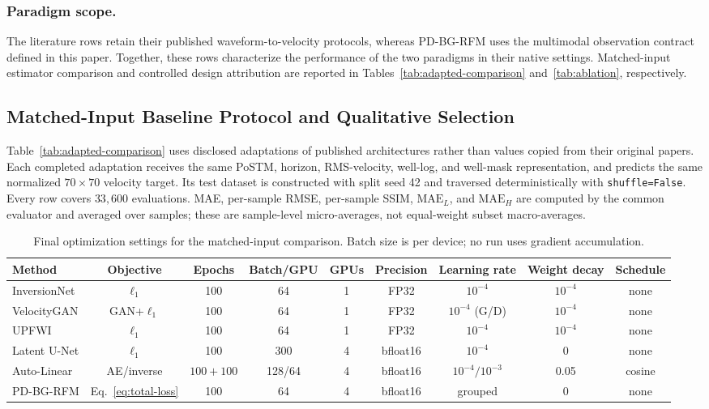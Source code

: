 \subsubsection{Paradigm scope.}
The literature rows retain their published waveform-to-velocity protocols, whereas PD-BG-RFM uses the multimodal observation contract defined in this paper. Together, these rows characterize the performance of the two paradigms in their native settings. Matched-input estimator comparison and controlled design attribution are reported in Tables~\ref{tab:adapted-comparison} and~\ref{tab:ablation}, respectively.


\subsection{Matched-Input Baseline Protocol and Qualitative Selection}
\label{app:adapted-accounting}
Table~\ref{tab:adapted-comparison} uses disclosed adaptations of published architectures rather than values copied from their original papers. Each completed adaptation receives the same PoSTM, horizon, RMS-velocity, well-log, and well-mask representation, and predicts the same normalized $70\times70$ velocity target. Its test dataset is constructed with split seed 42 and traversed deterministically with \texttt{shuffle=False}. Every row covers $33{,}600$ evaluations. MAE, per-sample RMSE, per-sample SSIM, $\mathrm{MAE}_L$, and $\mathrm{MAE}_H$ are computed by the common evaluator and averaged over samples; these are sample-level micro-averages, not equal-weight subset macro-averages.

\begin{table}[t]
\centering
\small
\begin{tabular}{@{}lcccccccc@{}}
\toprule
Method & Objective & Epochs & Batch/GPU & GPUs & Precision & Learning rate & Weight decay & Schedule \\
\midrule
InversionNet & $\ell_1$ & 100 & 64 & 1 & FP32 & $10^{-4}$ & $10^{-4}$ & none \\
VelocityGAN & GAN+$\ell_1$ & 100 & 64 & 1 & FP32 & $10^{-4}$ (G/D) & $10^{-4}$ & none \\
UPFWI & $\ell_1$ & 100 & 64 & 1 & FP32 & $10^{-4}$ & $10^{-4}$ & none \\
Latent U-Net & $\ell_1$ & 100 & 300 & 4 & bfloat16 & $10^{-4}$ & 0 & none \\
Auto-Linear & AE/inverse & $100+100$ & 128/64 & 4 & bfloat16 & $10^{-4}/10^{-3}$ & 0.05 & cosine \\
PD-BG-RFM & Eq.~\ref{eq:total-loss} & 100 & 64 & 4 & bfloat16 & grouped & 0 & none \\
\bottomrule
\end{tabular}
\caption{Final optimization settings for the matched-input comparison. Batch size is per device; no run uses gradient accumulation.}
\label{tab:final-optimization}
\end{table}

